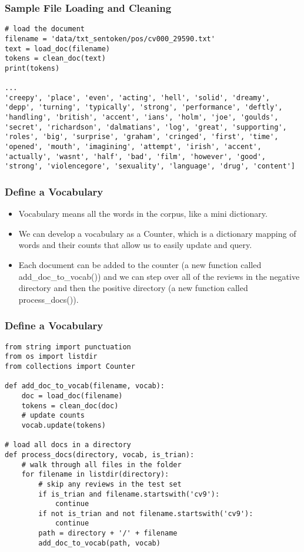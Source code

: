 \begin{frame}[fragile]\frametitle{Sample File Loading and Cleaning}
\begin{lstlisting}
# load the document
filename = 'data/txt_sentoken/pos/cv000_29590.txt'
text = load_doc(filename)
tokens = clean_doc(text)
print(tokens)

...
'creepy', 'place', 'even', 'acting', 'hell', 'solid', 'dreamy', 'depp', 'turning', 'typically', 'strong', 'performance', 'deftly', 'handling', 'british', 'accent', 'ians', 'holm', 'joe', 'goulds', 'secret', 'richardson', 'dalmatians', 'log', 'great', 'supporting', 'roles', 'big', 'surprise', 'graham', 'cringed', 'first', 'time', 'opened', 'mouth', 'imagining', 'attempt', 'irish', 'accent', 'actually', 'wasnt', 'half', 'bad', 'film', 'however', 'good', 'strong', 'violencegore', 'sexuality', 'language', 'drug', 'content']
\end{lstlisting}
\end{frame}


\begin{frame}[fragile]\frametitle{Define a Vocabulary}
\begin{itemize}
\item Vocabulary means all the words in the corpus, like a mini dictionary. 
\item We can develop a vocabulary as a Counter, which is a dictionary mapping of words and their counts that allow us to easily update and query.
\item Each document can be added to the counter (a new function called add\_doc\_to\_vocab()) and we can step over all of the reviews in the negative directory and then the positive directory (a new function called process\_docs()).
\end{itemize}
\end{frame}

\begin{frame}[fragile]\frametitle{Define a Vocabulary}
\begin{lstlisting}
from string import punctuation
from os import listdir
from collections import Counter

def add_doc_to_vocab(filename, vocab):
	doc = load_doc(filename)
	tokens = clean_doc(doc)
	# update counts
	vocab.update(tokens)

# load all docs in a directory
def process_docs(directory, vocab, is_trian):
	# walk through all files in the folder
	for filename in listdir(directory):
		# skip any reviews in the test set
		if is_trian and filename.startswith('cv9'):
			continue
		if not is_trian and not filename.startswith('cv9'):
			continue
		path = directory + '/' + filename
		add_doc_to_vocab(path, vocab)
\end{lstlisting}
\end{frame}

